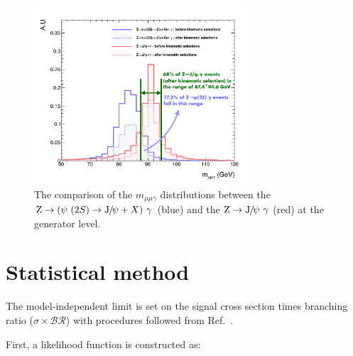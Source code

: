 	\begin{figure}[!ht]\begin{center}
	  \includegraphics[width=0.7\textwidth]{Fig/GenLevel_ZJpsiG/Psi2S_followup}
	  \caption{The comparison of the $m_{\mu\mu\gamma}$ distributions between the $\cPZ\to(\psi\ (2S)\to\JPsi +X)\ \gamma$ (blue) and the $\mathrm{Z}\to{\mathrm{J}\hspace{-.08em}/\hspace{-.14em}\psi}\ \gamma$ (red) at the generator level.}
	\label{fig:psi2Sfeeddown}\end{center}\end{figure}
	
	\section{Statistical method}
	\label{sec:Stat}
	The model-independent limit is set on the signal cross section times branching ratio ($\sigma\times\mathcal{BR}$) with procedures followed from Ref.~\cite{CLs_ref2,CLs_ref1,CLs_ref3,Cowan:2010js}. 
	
	First, a likelihood function is constructed as: 
	
